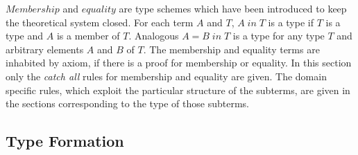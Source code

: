 \documentclass[11pt]{report}
\begin{document}
 $Membership$ and $equality$ are type schemes which have been
 introduced to keep the
 theoretical system closed. For each term $A$ and $T$,
 $A \;in \;T$ is a type
 if $T$ is a type  and $A$ is a member of $T$.
 Analogous $A=B\;in\;T$ is a type for
 any type $T$ and arbitrary elements $A$ and $B$ of $T$.
 The membership and equality terms are inhabited by axiom,
 if there is a proof for membership or equality.
 In this section only the \emph{catch all} rules
 for membership and equality are given. The domain specific rules,
 which exploit the particular structure of the subterms,
 are given in the sections corresponding to the type of
 those subterms.
  
 \subsection{Type Formation}
  
\end{document}
